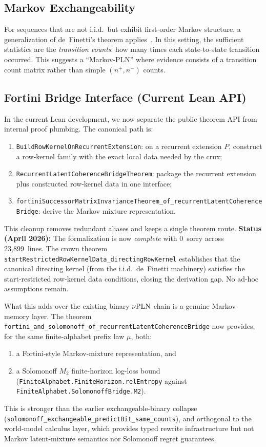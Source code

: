 \documentclass[]{article}
\begin{document}
\subsection{Markov Exchangeability}
For sequences that are not i.i.d.\ but exhibit first-order Markov
structure, a generalization of de~Finetti's theorem
applies~\cite{diaconisfreedman}.  In this setting, the sufficient
statistics are the \emph{transition counts}: how many times each
state-to-state transition occurred.  This suggests a ``Markov-PLN''
where evidence consists of a transition count matrix rather than
simple $(n^+, n^-)$ counts.

\subsection{Fortini Bridge Interface (Current Lean API)}
In the current Lean development, we now separate the public theorem
API from internal proof plumbing.  The canonical path is:
\begin{enumerate}
\item \texttt{BuildRowKernelOnRecurrentExtension}: on a recurrent extension
$P$, construct a row-kernel family with the exact local data needed by
the crux;
\item \texttt{RecurrentLatentCoherenceBridgeTheorem}: package the
recurrent extension plus constructed row-kernel data in one interface;
\item \texttt{fortiniSuccessorMatrixInvarianceTheorem\_of\_recurrentLatentCoherenceBridge}:
derive the Markov mixture representation.
\end{enumerate}

This cleanup removes redundant aliases and keeps a single theorem route.
\textbf{Status (April 2026):} The formalization is now \emph{complete}
with 0~sorry across 23,899~lines.  The crown theorem
\texttt{startRestrictedRowKernelData\_directingRowKernel} establishes
that the canonical directing kernel (from the i.i.d.\ de~Finetti
machinery) satisfies the start-restricted row-kernel data conditions,
closing the derivation gap.  No ad-hoc assumptions remain.

What this adds over the existing binary $\nu\textup{PLN}$ chain is a genuine
Markov-memory layer.  The theorem
\texttt{fortini\_and\_solomonoff\_of\_recurrentLatentCoherenceBridge}
now provides, for the same finite-alphabet prefix law $\mu$, both:
\begin{enumerate}
\item a Fortini-style Markov-mixture representation, and
\item a Solomonoff $M_2$ finite-horizon log-loss bound
(\texttt{FiniteAlphabet.FiniteHorizon.relEntropy} against
\texttt{FiniteAlphabet.SolomonoffBridge.M2}).
\end{enumerate}
This is stronger than the earlier exchangeable-binary collapse
(\texttt{solomonoff\_exchangeable\_predictBit\_same\_counts}), and
orthogonal to the world-model calculus layer, which provides typed
rewrite infrastructure but not Markov latent-mixture semantics nor
Solomonoff regret guarantees.
\end{document}
